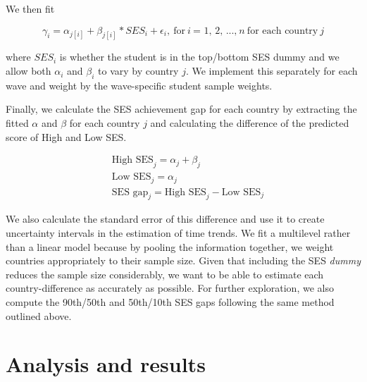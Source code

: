 \documentclass[11pt, a4paper]{article}\usepackage[]{graphicx}\usepackage[]{color}
\begin{document}
We then fit

\begin{equation}
\gamma_i = \alpha_{j[i]} + \beta_{j[i]} * SES_i + \epsilon_i,\ \text{for} \ i \ \text{= 1, 2, ...,} \ n \ \text{for each country} \ j
\end{equation}



where \(SES_i\) is whether the student is in the top/bottom SES dummy and we allow both \(\alpha_i\) and \(\beta_i\) to vary by country \(j\). We implement this separately for each wave and weight by the wave-specific student sample weights.

Finally, we calculate the SES achievement gap for each country by extracting the fitted \(\alpha\) and \(\beta\) for each country \(j\) and calculating the difference of the predicted score of High and Low SES.

\begin{equation}
\begin{split}
\quad \text{High SES}_j = \alpha_j + \beta_j \\
\quad \text{Low SES}_j = \alpha_j \\
\quad \text{SES gap}_j = \text{High SES}_j - \text{Low SES}_j
\end{split}
\end{equation}

We also calculate the standard error of this difference and use it to create uncertainty intervals in the estimation of time trends. We fit a multilevel rather than a linear model because by pooling the information together, we weight countries appropriately to their sample size. Given that including the SES \emph{dummy} reduces the sample size considerably, we want to be able to estimate each country-difference as accurately as possible. For further exploration, we also compute the 90th/50th and 50th/10th SES gaps following the same method outlined above.

\section{Analysis and results}
\end{document}
